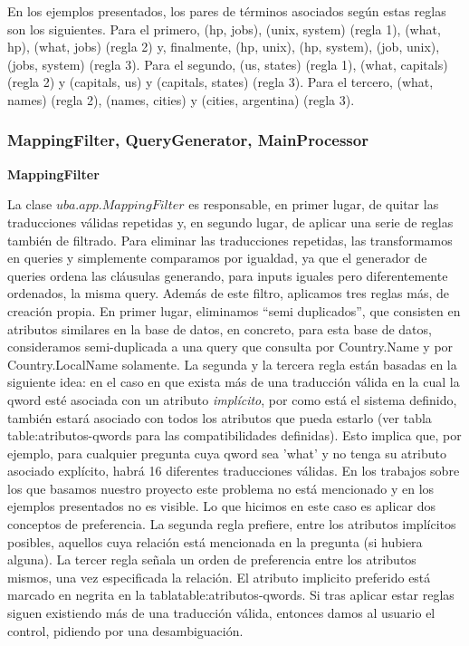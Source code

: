 \begin{frame}
En los ejemplos presentados, los pares de términos asociados según estas reglas son los siguientes. Para el primero, (hp, jobs), (unix, system)  (regla 1), (what, hp), (what, jobs) (regla 2) y, finalmente, (hp, unix), (hp, system), (job, unix), (jobs, system) (regla 3). Para el segundo, (us, states) (regla 1), (what, capitals) (regla 2) y (capitals, us) y (capitals, states) (regla 3). Para el tercero, (what, names) (regla 2), (names, cities) y (cities, argentina) (regla 3).

\end{frame}


\begin{frame}
\frametitle{MappingFilter, QueryGenerator, MainProcessor}

\textbf{MappingFilter}

La clase $uba.app.MappingFilter$ es responsable, en primer lugar, de quitar las traducciones válidas repetidas y, en segundo lugar, de aplicar una serie de reglas también de filtrado. Para eliminar las traducciones repetidas, las transformamos en queries y simplemente comparamos por igualdad, ya que el generador de queries ordena las cláusulas generando, para inputs iguales pero diferentemente ordenados, la misma query.
Además de este filtro, aplicamos tres reglas más, de creación propia. En primer lugar, eliminamos ``semi duplicados'', que consisten en atributos similares en la base de datos, en concreto, para esta base de datos, consideramos semi-duplicada a una query que consulta por Country.Name y por Country.LocalName solamente. La segunda y la tercera regla están basadas en la siguiente idea: en el caso en que exista más de una traducción válida en la cual la qword esté asociada con un atributo \textit{implícito}, por como está el sistema definido, también estará asociado con todos los atributos que pueda estarlo (ver tabla table:atributos-qwords para las compatibilidades definidas). Esto implica que, por ejemplo, para cualquier pregunta cuya qword sea 'what' y no tenga su atributo asociado explícito, habrá 16 diferentes traducciones válidas. En los trabajos sobre los que basamos nuestro proyecto este problema no está mencionado y en los ejemplos presentados no es visible. Lo que hicimos en este caso es aplicar dos conceptos de preferencia. La segunda regla prefiere, entre los atributos implícitos posibles, aquellos cuya relación está mencionada en la pregunta (si hubiera alguna). La tercer regla señala un orden de preferencia entre los atributos mismos, una vez especificada la relación. El atributo implicito preferido está marcado en negrita en la tablatable:atributos-qwords. Si tras aplicar estar reglas siguen existiendo más de una traducción válida, entonces damos al usuario el control, pidiendo por una desambiguación.



\end{frame}
